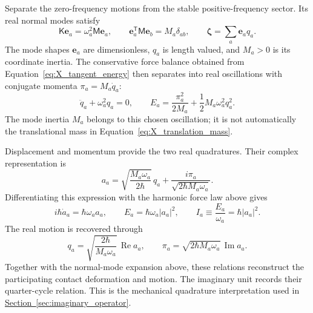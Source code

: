 Separate the zero-frequency motions from the stable positive-frequency sector. Its real normal modes satisfy
\begin{equation}
    \mathsf K\mathbf e_a=\omega_a^2\mathsf M\mathbf e_a,
    \qquad
    \mathbf e_a^{\mathsf T}\mathsf M\mathbf e_b=M_a\delta_{ab},
    \qquad
    \boldsymbol\zeta=\sum_a\mathbf e_a q_a.
\end{equation}
The mode shapes $\mathbf e_a$ are dimensionless, $q_a$ is length valued, and $M_a>0$ is its coordinate inertia. The conservative force balance obtained from Equation~\eqref{eq:X_tangent_energy} then separates into real oscillations with conjugate momenta $\pi_a=M_a\dot q_a$:
\begin{equation}
    \ddot q_a+\omega_a^2q_a=0,
    \qquad
    E_a=\frac{\pi_a^2}{2M_a}
    +\frac12M_a\omega_a^2q_a^2.
\end{equation}
The mode inertia $M_a$ belongs to this chosen oscillation; it is not automatically the translational mass in Equation~\eqref{eq:X_translation_mass}.

Displacement and momentum provide the two real quadratures. Their complex representation is
\begin{equation}
    a_a=\sqrt{\frac{M_a\omega_a}{2\hbar}}\,q_a
    +\frac{i\pi_a}{\sqrt{2\hbar M_a\omega_a}}.
    \label{eq:X_complex_quadrature}
\end{equation}
Differentiating this expression with the harmonic force law above gives
\begin{equation}
    \boxed{
    i\hbar\dot a_a=\hbar\omega_a a_a,
    \qquad
    E_a=\hbar\omega_a|a_a|^2,
    \qquad
    I_a\equiv\frac{E_a}{\omega_a}=\hbar|a_a|^2
    }.
    \label{eq:X_mode_action}
\end{equation}
The real motion is recovered through
\begin{equation}
    q_a=\sqrt{\frac{2\hbar}{M_a\omega_a}}\,
    \operatorname{Re}a_a,
    \qquad
    \pi_a=\sqrt{2\hbar M_a\omega_a}\,
    \operatorname{Im}a_a.
\end{equation}
Together with the normal-mode expansion above, these relations reconstruct the participating contact deformation and motion. The imaginary unit records their quarter-cycle relation. This is the mechanical quadrature interpretation used in \hyperref[sec:imaginary_operator]{Section~\ref*{sec:imaginary_operator}}.

